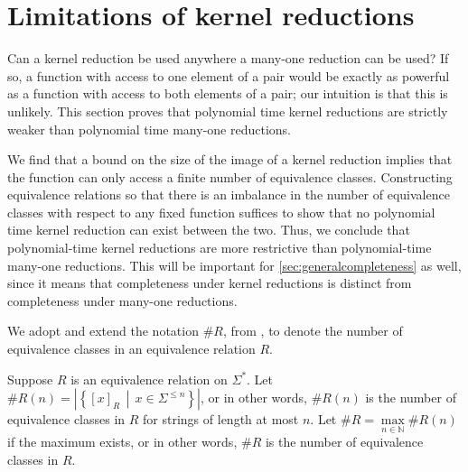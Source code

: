 \section{Limitations of kernel reductions}\label{sec:limitations}
%
Can a kernel reduction be used anywhere a many-one reduction can be used?
If so, a function with access to one element of a pair would be exactly as powerful as a function with access to both elements of a pair; our intuition is that this is unlikely.
This section proves that polynomial time kernel reductions are strictly weaker than polynomial time many-one reductions.

%
We find that a bound on the size of the image of a kernel reduction implies that the function can only access a finite number of equivalence classes.
Constructing equivalence relations so that there is an imbalance in the number of equivalence classes with respect to any fixed function suffices to show that no polynomial time kernel reduction can exist between the two.
Thus, we conclude that polynomial-time kernel reductions are more restrictive than polynomial-time many-one reductions.
This will be important for \autoref{sec:generalcompleteness} as well, since it means that completeness under kernel reductions is distinct from completeness under many-one reductions.

We adopt and extend the notation $\#R$, from \autocite{bcffm}, to denote the number of equivalence classes in an equivalence relation $R$.

\begin{definition}%
  Suppose $R$ is an equivalence relation on $\Sigma^*$.
  Let $\#R(n) = \left|\left\{[x]_R \, \middle| \, x \in \Sigma^{\leq n}\right\}\right|$, or in other words, $\#R(n)$ is the number of equivalence classes in $R$ for strings of length at most $n$.
  Let $\#R = \max\limits_{n \in \mathbb{N}} \#R(n)$ if the maximum exists, or in other words, $\#R$ is the number of equivalence classes in $R$.
\end{definition}

